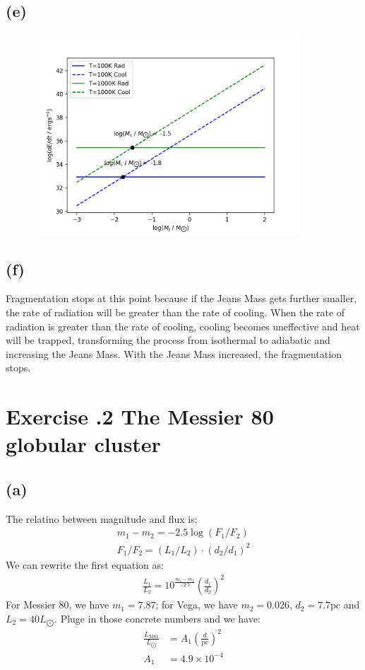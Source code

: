 \documentclass[a4paper,12pt]{article}
\begin{document}
\subsection*{(e)}
\begin{figure}[htbp]
    \centering
    \includegraphics[width=10cm]{frag.png}
\end{figure}

\subsection*{(f)}
Fragmentation stops at this point because if the Jeans Mass gets further smaller, 
the rate of radiation will be greater than the rate of cooling. When the rate of radiation 
is greater than the rate of cooling, cooling becomes uneffective and 
heat will be trapped, transforming the process from isothermal to adiabatic and 
increasing the Jeans Mass. With the Jeans Mass increased, the fragmentation stops.

\section*{\textbf{Exercise \uppercase\expandafter{}.2  The Messier 80 globular cluster}}  
\subsection*{(a)}
The relatino between magnitude and flux is:
\begin{align*}
    m_1 - m_2 = -2.5 \log (F_1/F_2) \\
    F_1/F_2 = (L_1 / L_2) \cdot (d_2 / d_1)^2 
\end{align*}
We can rewrite the first equation as:
\begin{align*}
    \frac{L_1}{L_2} = 10^{\frac{m_1 - m_2}{-2.5}} (\frac{d_1}{d_2})^2
\end{align*}
For Messier 80, we have $m_1 = 7.87$; 
for Vega, we have $m_2 = 0.026$, $d_2 = 7.7 \text{pc}$ and $L_2 = 40 L_{\bigodot} $. 
Pluge in those concrete numbers and we have:
\begin{align*}
    \frac{L_{\text{M81}}}{L_{\bigodot}} &= A_1 (\frac{d}{\text{pc}})^2 \\
    A_1 &= 4.9 \times 10^{-4}
\end{align*}
\end{document}
